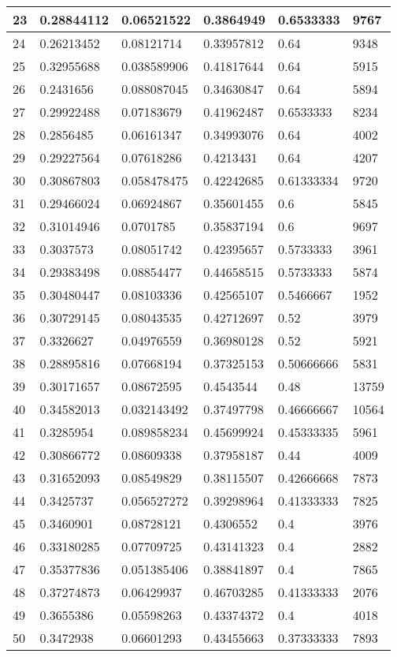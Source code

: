 \begin{longtable}{|l|l|l|l|l|l|}
23 & 0.28844112 & 0.06521522 & 0.3864949 & 0.6533333 & 9767 \\ \hline 
24 & 0.26213452 & 0.08121714 & 0.33957812 & 0.64 & 9348 \\ \hline 
25 & 0.32955688 & 0.038589906 & 0.41817644 & 0.64 & 5915 \\ \hline 
26 & 0.2431656 & 0.088087045 & 0.34630847 & 0.64 & 5894 \\ \hline 
27 & 0.29922488 & 0.07183679 & 0.41962487 & 0.6533333 & 8234 \\ \hline 
28 & 0.2856485 & 0.06161347 & 0.34993076 & 0.64 & 4002 \\ \hline 
29 & 0.29227564 & 0.07618286 & 0.4213431 & 0.64 & 4207 \\ \hline 
30 & 0.30867803 & 0.058478475 & 0.42242685 & 0.61333334 & 9720 \\ \hline 
31 & 0.29466024 & 0.06924867 & 0.35601455 & 0.6 & 5845 \\ \hline 
32 & 0.31014946 & 0.0701785 & 0.35837194 & 0.6 & 9697 \\ \hline 
33 & 0.3037573 & 0.08051742 & 0.42395657 & 0.5733333 & 3961 \\ \hline 
34 & 0.29383498 & 0.08854477 & 0.44658515 & 0.5733333 & 5874 \\ \hline 
35 & 0.30480447 & 0.08103336 & 0.42565107 & 0.5466667 & 1952 \\ \hline 
36 & 0.30729145 & 0.08043535 & 0.42712697 & 0.52 & 3979 \\ \hline 
37 & 0.3326627 & 0.04976559 & 0.36980128 & 0.52 & 5921 \\ \hline 
38 & 0.28895816 & 0.07668194 & 0.37325153 & 0.50666666 & 5831 \\ \hline 
39 & 0.30171657 & 0.08672595 & 0.4543544 & 0.48 & 13759 \\ \hline 
40 & 0.34582013 & 0.032143492 & 0.37497798 & 0.46666667 & 10564 \\ \hline 
41 & 0.3285954 & 0.089858234 & 0.45699924 & 0.45333335 & 5961 \\ \hline 
42 & 0.30866772 & 0.08609338 & 0.37958187 & 0.44 & 4009 \\ \hline 
43 & 0.31652093 & 0.08549829 & 0.38115507 & 0.42666668 & 7873 \\ \hline 
44 & 0.3425737 & 0.056527272 & 0.39298964 & 0.41333333 & 7825 \\ \hline 
45 & 0.3460901 & 0.08728121 & 0.4306552 & 0.4 & 3976 \\ \hline 
46 & 0.33180285 & 0.07709725 & 0.43141323 & 0.4 & 2882 \\ \hline 
47 & 0.35377836 & 0.051385406 & 0.38841897 & 0.4 & 7865 \\ \hline 
48 & 0.37274873 & 0.06429937 & 0.46703285 & 0.41333333 & 2076 \\ \hline 
49 & 0.3655386 & 0.05598263 & 0.43374372 & 0.4 & 4018 \\ \hline 
50 & 0.3472938 & 0.06601293 & 0.43455663 & 0.37333333 & 7893 \\ \hline 
\end{longtable}